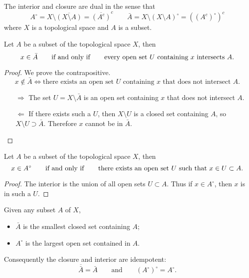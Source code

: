 \begin{lemma}
The interior and closure are dual in the sense that
\[ A^\circ = X\setminus\overline{(X\setminus A)} = \overline{(A^c)}^c \qquad \bar{A} = X\setminus(X\setminus A)^\circ = ((A^c)^\circ)^c \]
where $X$ is a topological space and $A$ is a subset.
\end{lemma}
\begin{proposition}\label{closure}
Let $A$ be a subset of the topological space $X$, then
\[ x\in \bar{A} \qquad \text{\textup{if and only if}}\qquad \text{every open set $U$ containing $x$ intersects $A$}.\]
\end{proposition}
\begin{proof}
We prove the contrapositive.
\[ x\notin \bar{A} \iff \text{there exists an open set $U$ containing $x$ that does not intersect $A$.} \]
\begin{itemize}
\item[$\boxed{\Rightarrow}$] The set $U = X\setminus \bar{A}$ is an open set containing $x$ that does not intersect $A$.
\item[$\boxed{\Leftarrow}$] If there exists such a $U$, then $X\setminus U$ is a closed set containing $A$, so $X\setminus U \supset \bar{A}$. Therefore $x$ cannot be in $\bar{A}$.
\end{itemize}
\end{proof}
\begin{proposition}\label{interior}
Let $A$ be a subset of the topological space $X$, then
\[ x\in A^\circ \qquad \text{\textup{if and only if}}\qquad \text{there exists an open set $U$ such that $x\in U \subset A$}.\]
\end{proposition}
\begin{proof}
The interior is the union of all open sets $U\subset A$. Thus if $x\in A^\circ$, then $x$ is in such a $U$.
\end{proof}
\begin{lemma}
Given any subset $A$ of $X$,
\begin{itemize}
\item $\bar{A}$ is the smallest closed set containing $A$;
\item $A^\circ$ is the largest open set contained in $A$.
\end{itemize}
Consequently the closure and interior are idempotent:
\[ \overline{\bar{A}} = \bar{A} \qquad \text{and} \qquad (A^\circ)^\circ = A^\circ. \]
\end{lemma}

